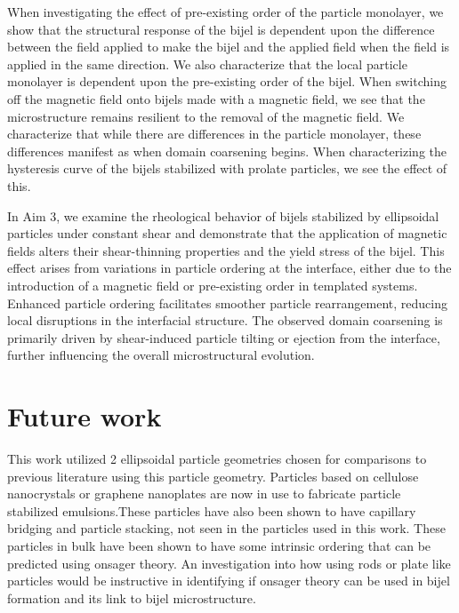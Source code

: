 When investigating the effect of pre-existing order of the particle monolayer, we show that the structural response of the bijel is dependent upon the
difference between the field applied to make the bijel and the applied field when the field is applied in the same direction. We also characterize that the
local particle monolayer is dependent upon the pre-existing order of the bijel. When switching off the magnetic field onto bijels made with a magnetic field,
we see that the microstructure remains resilient to the removal of the magnetic field. We characterize that while there are differences in the particle monolayer,
these differences manifest as when domain coarsening begins. When characterizing the hysteresis curve of the bijels stabilized with prolate particles,
we see the effect of this.

In Aim 3, we examine the rheological behavior of bijels stabilized by ellipsoidal particles under constant shear and demonstrate that the application of 
magnetic fields alters their shear-thinning properties and the yield stress of the bijel. This effect arises from variations in particle ordering at the interface, 
either due to the introduction of a magnetic field or pre-existing order in templated systems. Enhanced particle ordering facilitates smoother particle rearrangement, reducing local disruptions 
in the interfacial structure. The observed domain coarsening is primarily driven by shear-induced particle tilting or ejection from the interface, further 
influencing the overall microstructural evolution. 

\section{Future work}

This work utilized 2 ellipsoidal particle geometries chosen for comparisons to previous literature using this 
particle geometry. Particles based on cellulose nanocrystals or graphene nanoplates are now in use to fabricate
particle stabilized emulsions.These particles have also been shown to have capillary bridging and particle stacking,
not seen in the particles used in this work. These particles in bulk have been shown to have some intrinsic ordering
that can be predicted using onsager theory. An investigation into how using rods or plate like particles would be 
instructive in identifying if onsager theory can be used in bijel formation and its link to bijel microstructure. 
\cite{tan_2d_2021}


